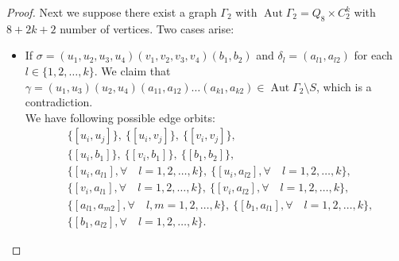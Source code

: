 \documentclass[12pt]{article}
\theoremstyle{plain}
\theoremstyle{definition}
\newcommand{\Aut}{\mathop{\mathrm{Aut}}}
\begin{document}
\begin{proof}
		
		
		
		
		
		Next we suppose there exist a graph $\Gamma_{2}$ with $\Aut \Gamma_{2} = Q_{8} \times C_{2}^{k}$ with $8+2k+2$ number of vertices. Two cases arise:
		\begin{itemize}
			\item [(a)] If $\sigma = (u_{1}, u_{2}, u_{3}, u_{4})(v_{1}, v_{2}, v_{3}, v_{4})(b_{1}, b_{2})$ and $\delta_{l} = (a_{l1}, a_{l2})$ for each $l \in \{1,2,\ldots,k\}$.
			We claim  that  $\gamma = (u_{1}, u_{3}) (u_{2}, u_{4})(a_{11}, a_{12})\ldots(a_{k1}, a_{k2}) \in \Aut \Gamma_{2} \setminus S$, which is a contradiction.\\
			We have following possible edge orbits:
			\begin{align*}
				& \{[u_{i}, u_{j}]\},\
				\{[u_{i}, v_{j}]\},\
				\{[v_{i}, v_{j}]\},\\
				&\{[u_{i}, b_{1}]\},\
				\{[v_{i}, b_{1}]\},\
				\{[b_{1}, b_{2}]\},\\
				&\{[u_{i}, a_{l1}], \forall \quad l =1,2,\ldots,k\},\
				\{[u_{i}, a_{l2}], \forall \quad l =1,2,\ldots,k\},\\	
				&\{[v_{i}, a_{l1}], \forall \quad l =1,2,\ldots,k\},\
				\{[v_{i}, a_{l2}], \forall \quad l =1,2,\ldots,k\},\\
				&\{[a_{l1}, a_{m2}], \forall \quad l,m =1,2,\ldots,k\},\
				\{[b_{1}, a_{l1}], \forall \quad l =1,2,\ldots,k\},\\
				&\{[b_{1}, a_{l2}], \forall \quad l =1,2,\ldots,k\}.		
			\end{align*}
			

\end{itemize}
\end{proof}
\end{document}
